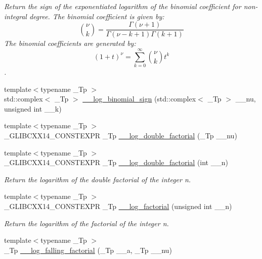 \begin{DoxyCompactItemize}
\begin{DoxyCompactList}\small\item\em Return the sign of the exponentiated logarithm of the binomial coefficient for non-\/integral degree. The binomial coefficient is given by\+: \[ \binom{\nu}{k} = \frac{\Gamma(\nu+1)}{\Gamma(\nu-k+1) \Gamma(k+1)} \] The binomial coefficients are generated by\+: \[ \left(1 + t\right)^\nu = \sum_{k=0}^\infty \binom{\nu}{k} t^k \]. \end{DoxyCompactList}\item 
{\footnotesize template$<$typename \+\_\+\+Tp $>$ }\\std\+::complex$<$ \+\_\+\+Tp $>$ \hyperlink{namespacestd_1_1____detail_ad73e7e0dfab6a4f54af026fa3d9e9c9a}{\+\_\+\+\_\+log\+\_\+binomial\+\_\+sign} (std\+::complex$<$ \+\_\+\+Tp $>$ \+\_\+\+\_\+nu, unsigned int \+\_\+\+\_\+k)
\item 
{\footnotesize template$<$typename \+\_\+\+Tp $>$ }\\\+\_\+\+G\+L\+I\+B\+C\+X\+X14\+\_\+\+C\+O\+N\+S\+T\+E\+X\+PR \+\_\+\+Tp \hyperlink{namespacestd_1_1____detail_ad7606a8224ac0c2256996b91051a48a5}{\+\_\+\+\_\+log\+\_\+double\+\_\+factorial} (\+\_\+\+Tp \+\_\+\+\_\+nu)
\item 
{\footnotesize template$<$typename \+\_\+\+Tp $>$ }\\\+\_\+\+G\+L\+I\+B\+C\+X\+X14\+\_\+\+C\+O\+N\+S\+T\+E\+X\+PR \+\_\+\+Tp \hyperlink{namespacestd_1_1____detail_aa832ed1d29fd41c40cf892cc1feef7e9}{\+\_\+\+\_\+log\+\_\+double\+\_\+factorial} (int \+\_\+\+\_\+n)
\begin{DoxyCompactList}\small\item\em Return the logarithm of the double factorial of the integer n. \end{DoxyCompactList}\item 
{\footnotesize template$<$typename \+\_\+\+Tp $>$ }\\\+\_\+\+G\+L\+I\+B\+C\+X\+X14\+\_\+\+C\+O\+N\+S\+T\+E\+X\+PR \+\_\+\+Tp \hyperlink{namespacestd_1_1____detail_a2809419dbbe9fc60066dacfdc13761d4}{\+\_\+\+\_\+log\+\_\+factorial} (unsigned int \+\_\+\+\_\+n)
\begin{DoxyCompactList}\small\item\em Return the logarithm of the factorial of the integer n. \end{DoxyCompactList}\item 
{\footnotesize template$<$typename \+\_\+\+Tp $>$ }\\\+\_\+\+Tp \hyperlink{namespacestd_1_1____detail_abc3aa91fde134d9f01be8fc8e7c7cc79}{\+\_\+\+\_\+log\+\_\+falling\+\_\+factorial} (\+\_\+\+Tp \+\_\+\+\_\+a, \+\_\+\+Tp \+\_\+\+\_\+nu)

\end{DoxyCompactItemize}
